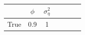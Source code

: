 \begin{tabular}{lcccccc}
\toprule
& $\phi$ & $\sigma_\eta^2$ \\
\midrule
True & 0.9 & 1 \\
\bottomrule
\end{tabular}
